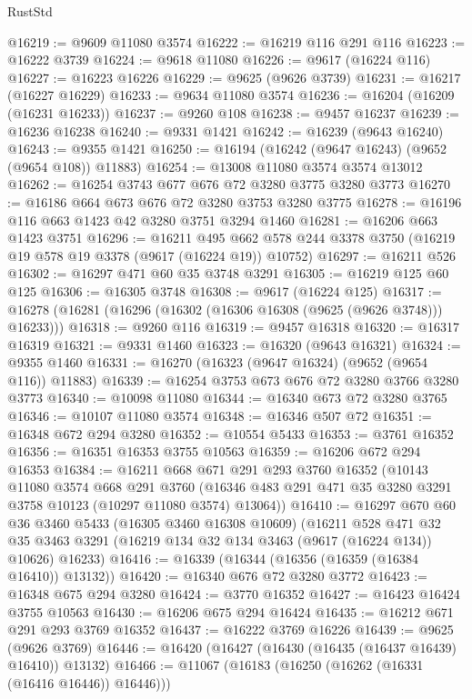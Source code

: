 \begin{lexlean}{RustStd}
\begin{coremodule}
@16219 := @9609 @11080 @3574
@16222 := @16219 @116 @291 @116
@16223 := @16222 @3739
@16224 := @9618 @11080
@16226 := @9617 (@16224 @116)
@16227 := @16223 @16226
@16229 := @9625 (@9626 @3739)
@16231 := @16217 (@16227 @16229)
@16233 := @9634 @11080 @3574
@16236 := @16204 (@16209 (@16231 @16233))
@16237 := @9260 @108
@16238 := @9457 @16237
@16239 := @16236 @16238
@16240 := @9331 @1421
@16242 := @16239 (@9643 @16240)
@16243 := @9355 @1421
@16250 := @16194 (@16242 (@9647 @16243) (@9652 (@9654 @108)) @11883)
@16254 := @13008 @11080 @3574 @3574 @13012
@16262 := @16254 @3743 @677 @676 @72 @3280 @3775 @3280 @3773
@16270 := @16186 @664 @673 @676 @72 @3280 @3753 @3280 @3775
@16278 := @16196 @116 @663 @1423 @42 @3280 @3751 @3294 @1460
@16281 := @16206 @663 @1423 @3751
@16296 := @16211
    @495
    @662
    @578
    @244
    @3378
    @3750
    (@16219 @19 @578 @19 @3378 (@9617 (@16224 @19)) @10752)
@16297 := @16211 @526
@16302 := @16297 @471 @60 @35 @3748 @3291
@16305 := @16219 @125 @60 @125
@16306 := @16305 @3748
@16308 := @9617 (@16224 @125)
@16317 := @16278 (@16281 (@16296 (@16302 (@16306 @16308 (@9625 (@9626 @3748))) @16233)))
@16318 := @9260 @116
@16319 := @9457 @16318
@16320 := @16317 @16319
@16321 := @9331 @1460
@16323 := @16320 (@9643 @16321)
@16324 := @9355 @1460
@16331 := @16270 (@16323 (@9647 @16324) (@9652 (@9654 @116)) @11883)
@16339 := @16254 @3753 @673 @676 @72 @3280 @3766 @3280 @3773
@16340 := @10098 @11080
@16344 := @16340 @673 @72 @3280 @3765
@16346 := @10107 @11080 @3574
@16348 := @16346 @507 @72
@16351 := @16348 @672 @294 @3280
@16352 := @10554 @5433
@16353 := @3761 @16352
@16356 := @16351 @16353 @3755 @10563
@16359 := @16206 @672 @294 @16353
@16384 := @16211
    @668
    @671
    @291
    @293
    @3760
    @16352
    (@10143
      @11080
      @3574
      @668
      @291
      @3760
      (@16346 @483 @291 @471 @35 @3280 @3291 @3758 @10123 (@10297 @11080 @3574) @13064))
@16410 := @16297
    @670
    @60
    @36
    @3460
    @5433
    (@16305 @3460 @16308 @10609)
    (@16211
      @528
      @471
      @32
      @35
      @3463
      @3291
      (@16219 @134 @32 @134 @3463 (@9617 (@16224 @134)) @10626)
      @16233)
@16416 := @16339 (@16344 (@16356 (@16359 (@16384 @16410)) @13132))
@16420 := @16340 @676 @72 @3280 @3772
@16423 := @16348 @675 @294 @3280
@16424 := @3770 @16352
@16427 := @16423 @16424 @3755 @10563
@16430 := @16206 @675 @294 @16424
@16435 := @16212 @671 @291 @293 @3769 @16352
@16437 := @16222 @3769 @16226
@16439 := @9625 (@9626 @3769)
@16446 := @16420 (@16427 (@16430 (@16435 (@16437 @16439) @16410)) @13132)
@16466 := @11067
    (@16183 (@16250 (@16262 (@16331 (@16416 @16446)) @16446)))

\end{coremodule}
\end{lexlean}
